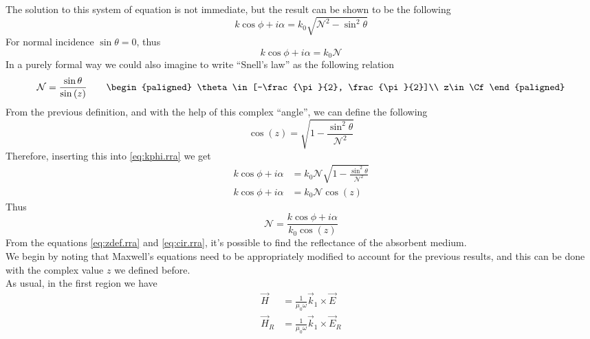 \documentclass[../electromagnetism.tex]{subfiles}
\begin{document}
The solution to this system of equation is not immediate, but the result can be shown to be the following
\begin{equation}
	k\cos\phi+i\alpha=k_0\sqrt{\mathcal{N}^2-\sin^2\theta}
	\label{eq:kphi.rra}
\end{equation}
For normal incidence $\sin\theta=0$, thus 
\begin{equation*}
	k\cos\phi+i\alpha=k_0\mathcal{N}
\end{equation*}
In a purely formal way we could also imagine to write ``Snell's law'' as the following relation
\begin{equation}
	\mathcal{N}=\frac{\sin\theta}{\sin\left( z \right)}\qquad\begin{paligned}
		\theta\in[-\frac{\pi}{2}, \frac{\pi}{2}]\\
		z\in\Cf
	\end{paligned}
	\label{eq:snellN.rra}
\end{equation}
From the previous definition, and with the help of this complex ``angle'', we can define the following
\begin{equation}
	\cos(z)=\sqrt{1-\frac{\sin^2\theta}{\mathcal{N}^2}}
	\label{eq:zdef.rra}
\end{equation}
Therefore, inserting this into \eqref{eq:kphi.rra} we get
\begin{equation}
	\begin{aligned}
		k\cos\phi+i\alpha&= k_0\mathcal{N}\sqrt{1-\frac{\sin^2\theta}{\mathcal{N}^2}}\\
		k\cos\phi+i\alpha&= k_0\mathcal{N}\cos(z)
	\end{aligned}
	\label{eq:kphi1.rra}
\end{equation}
Thus
\begin{equation}
	\mathcal{N}=\frac{k\cos\phi+i\alpha}{k_0\cos(z)}
	\label{eq:cir.rra}
\end{equation}
From the equations \eqref{eq:zdef.rra} and \eqref{eq:cir.rra}, it's possible to find the reflectance of the absorbent medium.\\
We begin by noting that Maxwell's equations need to be appropriately modified to account for the previous results, and this can be done with the complex value $z$ we defined before.\\
As usual, in the first region we have
\begin{equation}
	\begin{aligned}
		\vec{H}&= \frac{1}{\mu_0\omega}\vec{k}_1\times\vec{E}\\
		\vec{H}_R&= \frac{1}{\mu_0\omega}\vec{k}_{1}\times\vec{E}_R
	\end{aligned}
	\label{eq:region1.rra}
\end{equation}
\end{document}

